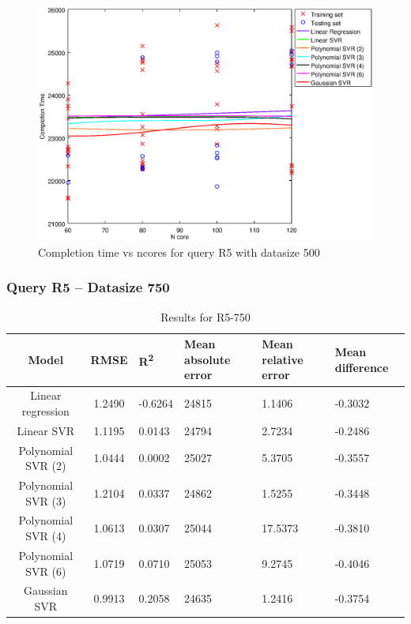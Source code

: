 \documentclass[a4paper,11pt]{article}
\begin{document}
\begin {figure}[hbtp]
\centering
\includegraphics[width=\textwidth]{output/R5_500_LINEAR_NCORE/plot_R5_500.eps}
\caption{Completion time vs ncores for query R5 with datasize 500}
\label{fig:all_linear_R5_500}
\end {figure}

\newpage
\subsubsection{Query R5 -- Datasize 750}
\begin{table}[H]
	\centering
	\begin{adjustbox}{center}
		\begin{tabular}{c | c M{1.2cm} M{2.5cm} M{2.5cm} M{1.8cm}}
			Model & RMSE & R\textsuperscript{2} & Mean absolute error & Mean relative error & Mean difference \tabularnewline
			\hline
			Linear regression & 1.2490 & -0.6264 &  24815 & 1.1406 & -0.3032 \\
			Linear SVR & 1.1195 & 0.0143 &  24794 & 2.7234 & -0.2486 \\
			Polynomial SVR (2) & 1.0444 & 0.0002 &  25027 & 5.3705 & -0.3557 \\
			Polynomial SVR (3) & 1.2104 & 0.0337 &  24862 & 1.5255 & -0.3448 \\
			Polynomial SVR (4) & 1.0613 & 0.0307 &  25044 & 17.5373 & -0.3810 \\
			Polynomial SVR (6) & 1.0719 & 0.0710 &  25053 & 9.2745 & -0.4046 \\
			Gaussian SVR & 0.9913 & 0.2058 &  24635 & 1.2416 & -0.3754 \\
		\end{tabular}
	\end{adjustbox}
	\\
	\caption{Results for R5-750}
	\label{fig:all_linear_R5_750}
\end{table}
\end{document}
